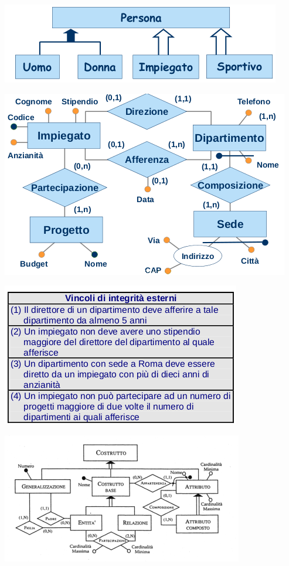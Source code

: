 \documentclass[a4paper,12pt, oneside]{book}
\begin{document}
\begin{center}
	\includegraphics[scale=0.8]{img/isa7.png}
\end{center}
\begin{center}
	\includegraphics[scale=2.5]{img/vin.png}
\end{center}
\begin{center}
	\includegraphics[scale=0.7]{img/vin2.png}
\end{center}
\begin{center}
	\includegraphics[scale=0.8]{img/vin3.png}
\end{center}
\end{document}
